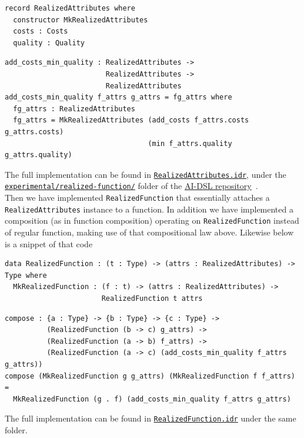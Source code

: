 \documentclass[]{report}
\begin{document}
\begin{verbatim}
record RealizedAttributes where
  constructor MkRealizedAttributes
  costs : Costs
  quality : Quality
\end{verbatim}

\begin{verbatim}
add_costs_min_quality : RealizedAttributes ->
                        RealizedAttributes ->
                        RealizedAttributes
add_costs_min_quality f_attrs g_attrs = fg_attrs where
  fg_attrs : RealizedAttributes
  fg_attrs = MkRealizedAttributes (add_costs f_attrs.costs g_attrs.costs)
                                  (min f_attrs.quality g_attrs.quality)
\end{verbatim}
The full implementation can be found in
\href{https://github.com/singnet/ai-dsl/blob/master/experimental/realized-function/RealizedAttributes.idr}{\texttt{RealizedAttributes.idr}},
under the
\href{https://github.com/singnet/ai-dsl/blob/master/experimental/realized-function/}{\texttt{experimental/realized-function/}}
folder of the \href{https://github.com/singnet/ai-dsl/}{AI-DSL
  repository}~\cite{AIDSLRepo}.\\

Then we have implemented \texttt{RealizedFunction} that essentially
attaches a \texttt{RealizedAttributes} instance to a function.  In
addition we have implemented a composition (as in function
composition) operating on \texttt{RealizedFunction} instead of
regular function, making use of that compositional law above.
Likewise below is a snippet of that code

\begin{verbatim}
data RealizedFunction : (t : Type) -> (attrs : RealizedAttributes) -> Type where
  MkRealizedFunction : (f : t) -> (attrs : RealizedAttributes) ->
                       RealizedFunction t attrs
\end{verbatim}

\begin{verbatim}
compose : {a : Type} -> {b : Type} -> {c : Type} ->
          (RealizedFunction (b -> c) g_attrs) ->
          (RealizedFunction (a -> b) f_attrs) ->
          (RealizedFunction (a -> c) (add_costs_min_quality f_attrs g_attrs))
compose (MkRealizedFunction g g_attrs) (MkRealizedFunction f f_attrs) =
  MkRealizedFunction (g . f) (add_costs_min_quality f_attrs g_attrs)
\end{verbatim}
The full implementation can be found in
\href{https://github.com/singnet/ai-dsl/blob/master/experimental/realized-function/RealizedFunction.idr}{\texttt{RealizedFunction.idr}}
under the same folder.
\end{document}

